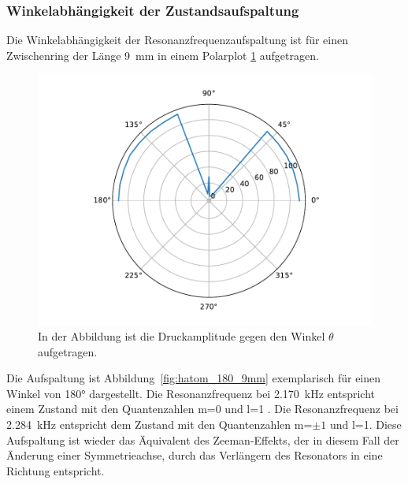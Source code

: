         \subsubsection*{Winkelabhängigkeit der Zustandsaufspaltung}
            Die Winkelabhängigkeit der Resonanzfrequenzaufspaltung ist für einen Zwischenring der Länge \SI{9}{\milli\metre} in einem Polarplot \ref{fig:H_atom_resonanz_4} aufgetragen.  
            \FloatBarrier 
            \begin{figure}[ht!]
                \centering
                \includegraphics[scale=0.5]{./pictures/H_atom_resonanz_4.pdf}
                \caption{In der Abbildung ist die Druckamplitude gegen den Winkel $\theta$ aufgetragen.}
                \label{fig:H_atom_resonanz_4}
            \end{figure}
            \FloatBarrier
            Die Aufspaltung ist Abbildung~\ref{fig:hatom_180_9mm} exemplarisch für einen Winkel von 180° dargestellt. Die Resonanzfrequenz bei \SI{2.170}{\kilo\hertz} entspricht einem Zustand mit den 
            Quantenzahlen m=0 und l=1 . Die Resonanzfrequenz bei \SI{2.284}{\kilo\hertz} entspricht dem Zustand mit den Quantenzahlen m=$\pm 1$ und l=1. Diese Aufspaltung ist wieder das Äquivalent des
            Zeeman-Effekts, der in diesem Fall der Änderung einer Symmetrieachse, durch das Verlängern des Resonators in eine Richtung entspricht.
            \FloatBarrier
